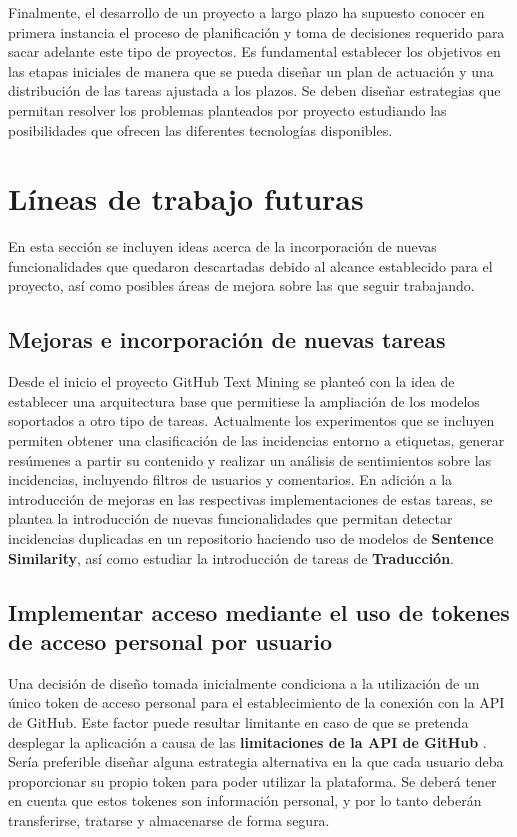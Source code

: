 Finalmente, el desarrollo de un proyecto a largo plazo ha supuesto conocer en primera instancia el proceso de planificación y toma de decisiones requerido para sacar adelante este tipo de proyectos. Es fundamental establecer los objetivos en las etapas iniciales de manera que se pueda diseñar un plan de actuación y una distribución de las tareas ajustada a los plazos. Se deben diseñar estrategias que permitan resolver los problemas planteados por proyecto estudiando las posibilidades que ofrecen las diferentes tecnologías disponibles. 


\section{Líneas de trabajo futuras}

En esta sección se incluyen ideas acerca de la incorporación de nuevas funcionalidades que quedaron descartadas debido al alcance establecido para el proyecto, así como posibles áreas de mejora sobre las que seguir trabajando.

\subsection{Mejoras e incorporación de nuevas tareas}

Desde el inicio el proyecto GitHub Text Mining se planteó con la idea de establecer una arquitectura base que permitiese la ampliación de los modelos soportados a otro tipo de tareas. Actualmente los experimentos que se incluyen permiten obtener una clasificación de las incidencias entorno a etiquetas, generar resúmenes a partir su contenido y realizar un análisis de sentimientos sobre las incidencias, incluyendo filtros de usuarios y comentarios. En adición a la introducción de mejoras en las respectivas implementaciones de estas tareas, se plantea la introducción de nuevas funcionalidades que permitan detectar incidencias duplicadas en un repositorio haciendo uso de modelos de \textbf{Sentence Similarity}, así como estudiar la introducción de tareas de \textbf{Traducción}.

\subsection{Implementar acceso mediante el uso de tokenes de acceso personal por usuario}

Una decisión de diseño tomada inicialmente condiciona a la utilización de un único token de acceso personal para el establecimiento de la conexión con la API de GitHub. Este factor puede resultar limitante en caso de que se pretenda desplegar la aplicación a causa de las \textbf{limitaciones de la API de GitHub} \cite{lf:github_api_limits}. Sería preferible diseñar alguna estrategia alternativa en la que cada usuario deba proporcionar su propio token para poder utilizar la plataforma. Se deberá tener en cuenta que estos tokenes son información personal, y por lo tanto deberán transferirse, tratarse y almacenarse de forma segura.

